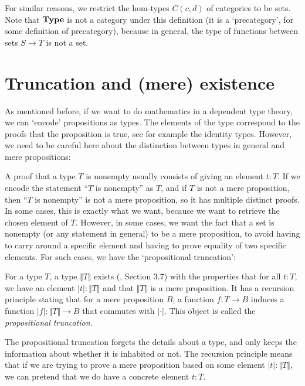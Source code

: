 For similar reasons, we restrict the hom-types $ C(c, d) $ of categories to be sets. Note that $ \mathbf{Type} $ is not a category under this definition (it is a `precategory', for some definition of precategory), because in general, the type of functions between sets $ S \to T $ is not a set.

\section{Truncation and (mere) existence}
As mentioned before, if we want to do mathematics in a dependent type theory, we can `encode' propositions as types. The elements of the type correspond to the proofs that the proposition is true, see for example the identity types. However, we need to be careful here about the distinction between types in general and mere propositions:

A proof that a type $ T $ is nonempty usually consists of giving an element $ t : T $. If we encode the statement ``$ T $ is nonempty'' as $ T $, and if $ T $ is not a mere proposition, then ``$ T $ is nonempty'' is not a mere proposition, so it has multiple distinct proofs. In some cases, this is exactly what we want, because we want to retrieve the chosen element of $ T $. However, in some cases, we want the fact that a set is nonempty (or any statement in general) to be a mere proposition, to avoid having to carry around a specific element and having to prove equality of two specific elements. For such cases, we have the `propositional truncation':

\begin{definition}
  For a type $ T $, a type $ \Vert T \Vert $ exists (\autocite{hottbook}, Section 3.7) with the properties that for all $ t: T $, we have an element $ \vert t \vert : \Vert T \Vert $ and that $ \Vert T \Vert $ is a mere proposition. It has a recursion principle stating that for a mere proposition $ B $, a function $ f: T \to B $ induces a function $ \vert f \vert: \Vert T \Vert \to B $ that commutes with $ \vert \cdot \vert $. This object is called the \textit{propositional truncation}.
\end{definition}
The propositional truncation forgets the details about a type, and only keeps the information about whether it is inhabited or not. The recursion principle means that if we are trying to prove a mere proposition based on some element $ \vert t \vert: \Vert T \Vert $, we can pretend that we do have a concrete element $ t: T $.

